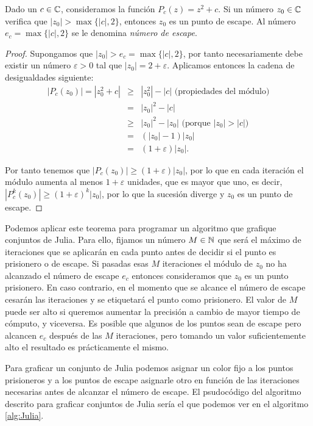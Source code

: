 \begin{teorema}
\label{th:escape}
  Dado un $c\in\mathbb{C}$, consideramos la función $P_c(z)=z^2+c$. Si un número $z_0\in\mathbb{C}$ verifica que $|z_0|>\max\{|c|,2\}$, entonces $z_0$ es un punto de escape. Al número $e_c=\max\{|c|,2\}$ se le denomina \textit{número de escape}.
\end{teorema}
\begin{proof}
  Supongamos que $|z_0|>e_c=\max\{|c|,2\}$, por tanto necesariamente debe existir un número $\varepsilon>0$ tal que $|z_0| = 2 + \varepsilon$. Aplicamos entonces la cadena de desigualdades siguiente:
  \begin{eqnarray*}
    |P_c(z_0)| = |z_0^2 + c| & \geq & |z_0^2| - |c|\text{  (propiedades del módulo)} \\
    & = & |z_0|^2 - |c| \\
    & \geq & |z_0|^2 - |z_0|\text{  (porque } |z_0|>|c| \text{)} \\
    & = & (|z_0|-1)|z_0| \\
    & = & (1 + \varepsilon)|z_0|.
  \end{eqnarray*}

  Por tanto tenemos que $|P_c(z_0)|\geq(1 + \varepsilon)|z_0|$, por lo que en cada iteración el módulo aumenta al menos $1+\varepsilon$ unidades, que es mayor que uno, es decir, $|P_c^k(z_0)|\geq(1+\varepsilon)^k|z_0|$, por lo que la sucesión diverge y $z_0$ es un punto de escape. 
\end{proof}

Podemos aplicar este teorema para programar un algoritmo que grafique conjuntos de Julia. Para ello, fijamos un número $M\in\mathbb{N}$ que será el máximo de iteraciones que se aplicarán en cada punto antes de decidir si el punto es prisionero o de escape. Si pasadas esas $M$ iteraciones el módulo de $z_0$ no ha alcanzado el número de escape $e_c$ entonces consideramos que $z_0$ es un punto prisionero. En caso contrario, en el momento que se alcance el número de escape cesarán las iteraciones y se etiquetará el punto como prisionero. El valor de $M$ puede ser alto si queremos aumentar la precisión a cambio de mayor tiempo de cómputo, y viceversa. Es posible que algunos de los puntos sean de escape pero alcancen $e_c$ después de las $M$ iteraciones, pero tomando un valor suficientemente alto el resultado es prácticamente el mismo.

Para graficar un conjunto de Julia podemos asignar un color fijo a los puntos prisioneros y a los puntos de escape asignarle otro en función de las iteraciones necesarias antes de alcanzar el número de escape. El psudocódigo del algoritmo descrito para graficar conjuntos de Julia sería el que podemos ver en el algoritmo \ref{alg:Julia}.

